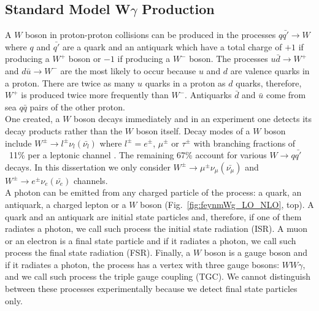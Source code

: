 \subsection{Standard Model W$\gamma$ Production}
\label{WgAbout_SMproduction}

A $W$ boson in proton-proton collisions can be produced in the processes $q {\bar{q'}} \rightarrow W$ where $q$ and $\bar{q'}$ are a quark and an antiquark which have a total charge of $+1$ if producing a $W^+$ boson or $-1$ if producing a $W^-$ boson. The processes $u\bar{d}\rightarrow W^+$ and $d\bar{u}\rightarrow W^-$ are the most likely to occur because $u$ and $d$ are valence quarks in a proton. There are twice as many $u$ quarks in a proton as $d$ quarks, therefore, $W^+$ is produced twice more frequently than $W^-$. Antiquarks $\bar{d}$ and $\bar{u}$ come from sea $q\bar{q}$ pairs of the other proton.\\

One created, a $W$ boson decays immediately and in an experiment one detects its decay products rather than the $W$ boson itself. Decay modes of a $W$ boson include $W^\pm \rightarrow l^\pm \nu_l ({\bar{\nu_l}})$ where $l^\pm=e^\pm$, $\mu^\pm$ or $\tau^\pm$ with branching fractions of ~11\% per a leptonic channel \cite{ref_PDG}. The remaining 67\% account for various $W\rightarrow q\bar{q'}$ decays. In this dissertation we only consider $W^\pm \rightarrow \mu^\pm \nu_\mu ({\bar{\nu_\mu}})$ and $W^\pm \rightarrow e^\pm \nu_e ({\bar{\nu_e}})$ channels.\\


A photon can be emitted from any charged particle of the process: a quark, an antiquark, a charged lepton or a $W$ boson (Fig.~\ref{fig:feynmWg_LO_NLO}, top). A quark and an antiquark are initial state particles and, therefore, if one of them radiates a photon, we call such process the initial state radiation (ISR). A muon or an electron is a final state particle and if it radiates a photon, we call such process the final state radiation (FSR). Finally, a $W$ boson is a gauge boson and if it radiates a photon, the process has a vertex with three gauge bosons: $WW\gamma$, and we call such process the triple gauge coupling (TGC). We cannot distinguish between these processes experimentally because we detect final state particles only.\\

